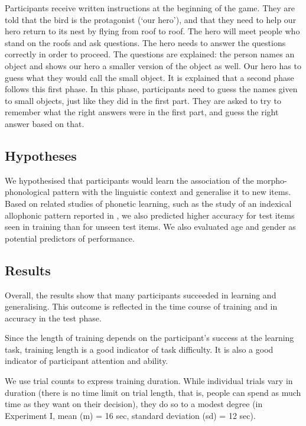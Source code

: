 \documentclass{frontiersSCNS} %
\begin{document}
Participants receive written instructions at the beginning of the game. They are told that the bird is the protagonist (`our hero'), and that they need to help our hero return to its nest by flying from roof to roof. The hero will meet people who stand on the roofs and ask questions. The hero needs to answer the questions correctly in order to proceed. The questions are explained: the person names an object and shows our hero a smaller version of the object as well. Our hero has to guess what they would call the small object. It is explained that a second phase follows this first phase. In this phase, participants need to guess the names given to small objects, just like they did in the first part. They are asked to try to remember what the right answers were in the first part, and guess the right answer based on that.

\subsection{Hypotheses}

We hypothesised that participants would learn the association of the morpho-phonological pattern with the linguistic context and generalise it to new items. Based on related studies of phonetic learning, such as the study of an indexical allophonic pattern reported in \cite{german2013}, we also predicted higher accuracy for test items seen in training than for 
unseen test items. We also evaluated age and gender as  potential predictors of  performance.

 \subsection{Results}

Overall, the results show that many participants succeeded in learning and generalising. This outcome is reflected in the time course of training and in accuracy in the test phase.


Since the length of training depends on the participant's success at the learning task, training length is a good indicator of task difficulty. It is also a good indicator of participant attention and ability.


We use trial counts to express training duration. While individual trials vary in duration (there is no time
limit on trial length, that is, people can spend as much time as they want on their decision), they do so to a modest degree (in
Experiment I, mean (m) = 16 sec, standard deviation (sd) = 12 sec). 
\end{document}
